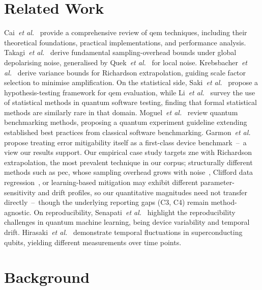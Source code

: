 \documentclass[10pt,conference]{IEEEtran}
\newcommand{\etal}{\emph{et al.}\xspace}
\begin{document}
\section{Related Work}
\label{sec:related}
Cai~\etal~\cite{cai_quantum_2023} provide a comprehensive review of \gls{qem} techniques, including their theoretical foundations, practical implementations, and performance analysis. Takagi~\etal~\cite{takagi_fundamental_2022} derive fundamental sampling-overhead bounds under global depolarising noise, generalised by Quek~\etal~\cite{quek_exponentially_2024} for local noise. Krebsbacher~\etal~\cite{krebsbach_optimization_2022} derive variance bounds for Richardson extrapolation, guiding scale factor selection to minimise amplification. On the statistical side, Saki~\etal~\cite{saki_hypothesis_2023} propose a hypothesis-testing framework for \gls{qem} evaluation, while Li~\etal~\cite{li_methodological_2026} survey the use of statistical methods in quantum software testing, finding that formal statistical methods are similarly rare in that domain. Moguel~\etal~\cite{moguel_quantum_2024} review quantum benchmarking methods, proposing a quantum experiment guideline extending established best practices from classical software benchmarking. Garmon~\etal~\cite{Garmon_2020} propose treating error mitigability itself as a first-class device benchmark~--~a view our results support. Our empirical case study targets \gls{zne} with Richardson extrapolation, the most prevalent technique in our corpus; structurally different methods such as \gls{pec}, whose sampling overhead grows with noise~\cite{berg_probabilistic_2023}, Clifford data regression~\cite{czarnik_error_2021}, or learning-based mitigation may exhibit different parameter-sensitivity and drift profiles, so our quantitative magnitudes need not transfer directly~--~though the underlying reporting gaps (C3, C4) remain method-agnostic. 
On reproducibility, Senapati~\etal~\cite{senapati_towards_2023, senapati_pqml_2024} highlight the reproducibility challenges in quantum machine learning, being device variability and temporal drift. Hirasaki~\etal~\cite{hirasaki_detection_2023} demonstrate temporal fluctuations in superconducting qubits, yielding different measurements over time points. 

\section{Background}
\label{sec:background}
\end{document}
